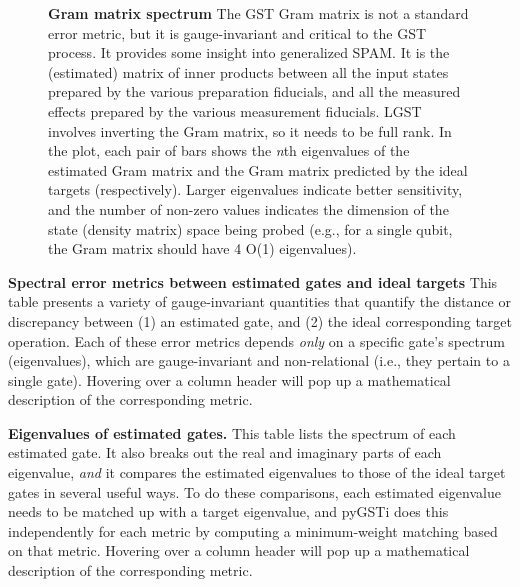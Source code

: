 \documentclass{article}[11pt]
\newcommand{\putfield}[2]{#2}
\begin{document}
{        
\begin{figure}[h]
  \begin{center}
    \begin{adjustbox}{max width=\textwidth}
      \putfield{gramBarPlot}{}
    \end{adjustbox}
    \caption{\textbf{Gram matrix spectrum} The GST Gram matrix is not a standard error metric, but it is gauge-invariant and critical to the GST process.  It provides some insight into generalized SPAM.  It is the (estimated) matrix of inner products between all the input states prepared by the various preparation fiducials, and all the measured effects prepared by the various measurement fiducials.  LGST involves inverting the Gram matrix, so it needs to be full rank.  In the plot, each pair of bars shows the \emph{n}th  eigenvalues of the estimated Gram matrix and the Gram matrix predicted by the ideal targets (respectively).  Larger eigenvalues indicate better sensitivity, and the number of non-zero values indicates the dimension of the state (density matrix) space being probed (e.g., for a single qubit, the Gram matrix should have 4 O(1) eigenvalues).}
  \end{center}
\end{figure}


\begin{table}[h]
  \begin{center}
    \begin{adjustbox}{max width=\textwidth}
      \putfield{bestGatesVsTargetTable_gi}{}
    \end{adjustbox}
    \caption{\textbf{Spectral error metrics between estimated gates and ideal targets} This table presents a variety of gauge-invariant quantities that quantify the distance or discrepancy between (1) an estimated gate, and (2) the ideal corresponding target operation.  Each of these error metrics depends \emph{only} on a specific gate's spectrum (eigenvalues), which are gauge-invariant and non-relational (i.e., they pertain to a single gate).  Hovering over a column header will pop up a mathematical description of the corresponding metric.}
  \end{center}
\end{table}

        
\begin{table}[h]
  \begin{center}
    \begin{adjustbox}{max width=\textwidth}
      \putfield{bestGatesetEvalTable}{}
    \end{adjustbox}
    \caption{\textbf{Eigenvalues of estimated gates.}  This table lists the spectrum of each estimated gate.  It also breaks out the real and imaginary parts of each eigenvalue, \emph{and} it compares the estimated eigenvalues to those of the ideal target gates in several useful ways.  To do these comparisons, each estimated eigenvalue needs to be matched up with a target eigenvalue, and pyGSTi does this independently for each metric by computing a minimum-weight matching based on that metric.  Hovering over a column header will pop up a mathematical description of the corresponding metric.}
  \end{center}
\end{table}


}
\end{document}
